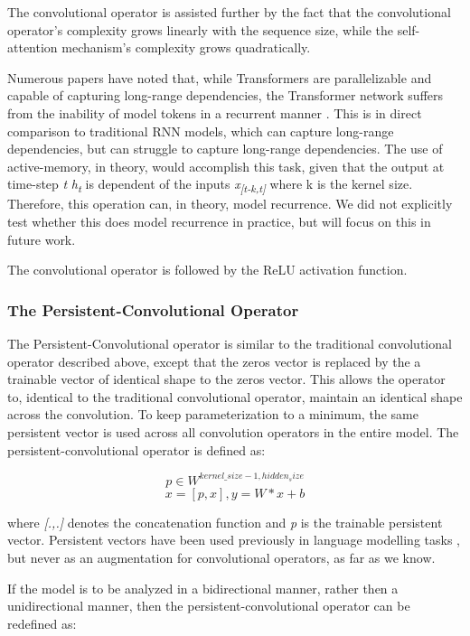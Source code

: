 \documentclass{article}
\begin{document}
The convolutional operator is assisted further by the fact that the convolutional operator’s complexity grows linearly with the sequence size, while the self-attention mechanism’s complexity grows quadratically.

Numerous papers have noted that, while Transformers are parallelizable and capable of capturing long-range dependencies, the Transformer network suffers from the inability of model tokens in a recurrent manner \cite{wang2019} \cite{hao}. This is in direct comparison to traditional RNN models, which can capture long-range dependencies, but can struggle to capture long-range dependencies. The use of active-memory, in theory, would accomplish this task, given that the output at time-step \textit{t} \textit{h\textsubscript{t}} is dependent of the inputs \textit{x\textsubscript{[t-k,t]}} where k is the kernel size. Therefore, this operation can, in theory, model recurrence. We did not explicitly test whether this does model recurrence in practice, but will focus on this in future work.

The convolutional operator is followed by the ReLU activation function.

\subsubsection{The Persistent-Convolutional Operator}

The Persistent-Convolutional operator is similar to the traditional convolutional operator described above, except that the zeros vector is replaced by the a trainable vector of identical shape to the zeros vector. This allows the operator to, identical to the traditional convolutional operator, maintain an identical shape across the convolution. To keep parameterization to a minimum, the same persistent vector is used across all convolution operators in the entire model. The persistent-convolutional operator is defined as:

\[p \in W^{kernel\_size - 1, hidden_size} \]
\[x = [p, x],   y = W * x + b \]

\noindent
where \textit{[.,.]} denotes the concatenation function and \textit{p} is the trainable persistent vector. Persistent vectors have been used previously in language modelling tasks \cite{sukbaatar2019}, but never as an augmentation for convolutional operators, as far as we know.

If the model is to be analyzed in a bidirectional manner, rather then a unidirectional manner, then the persistent-convolutional operator can be redefined as:
\end{document}
